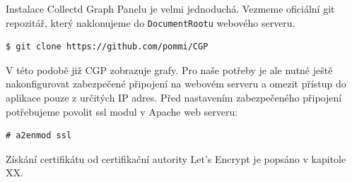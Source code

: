 \documentclass[thesis=B,czech]{FITthesis}[2012/06/26]
\begin{document}
Instalace Collectd Graph Panelu je velmi jednoduchá. Vezmeme oficiální git repozitář, který naklonujeme do \texttt{DocumentRootu} webového serveru.

\begin{verbatim}
$ git clone https://github.com/pommi/CGP
\end{verbatim}

V této podobě již CGP zobrazuje grafy. Pro naše potřeby je ale nutné ještě nakonfigurovat zabezpečené připojení na webovém serveru a omezit přístup do aplikace pouze z určitých IP adres. Před nastavením zabezpečeného připojení potřebujeme povolit ssl modul v Apache web serveru:
\begin{verbatim}
# a2enmod ssl
\end{verbatim}

Získání certifikátu od certifikační autority Let's Encrypt je popsáno v kapitole XX.












\end{document}
